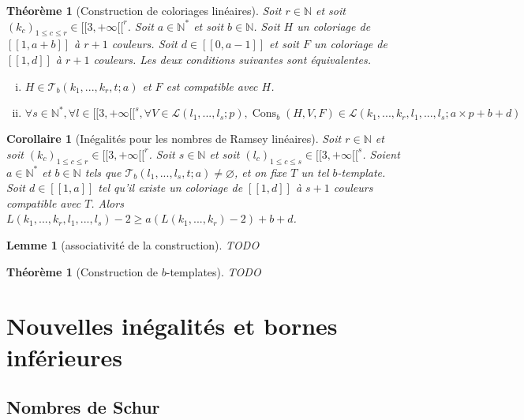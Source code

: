 \documentclass{article}
\newtheorem{theorem}[definition]{Théorème}
\newtheorem{corollary}[definition]{Corollaire}
\newtheorem{lemma}[definition]{Lemme}
\DeclareMathOperator{\cons}{Cons}
\begin{document}
\begin{theorem}[Construction de coloriages linéaires]
\label{thm:b-temp}
Soit \(r \in \mathbb{N}\) et soit \((k_c)_{1 \leqslant c \leqslant r} \in {[\![3, +\infty[\![}^r\). Soit \(a \in \mathbb{N}^*\) et soit \(b \in \mathbb{N}\). Soit \(H\) un coloriage de \([\![1, a + b]\!]\) à \(r + 1\) couleurs. Soit \(d \in [\![0, a - 1]\!]\) et soit \(F\) un coloriage de \([\![1, d]\!]\) à \(r + 1\) couleurs. Les deux conditions suivantes sont équivalentes.

\begin{enumerate}[(i)]
\item \(H \in \mathcal{T}_b(k_1, ..., k_r, t; a)\) et \(F\) est compatible  avec \(H\).
\item \(\forall s \in \mathbb{N}^*, \forall l \in {[\![3, +\infty[\![}^s, \forall V \in \mathcal{L}(l_1, ..., l_s ; p), \cons_b(H, V, F) \in  \mathcal{L}(k_1, ..., k_r, l_1, ..., l_s ; a \times p + b + d)\)
\end{enumerate}
\end{theorem}

\begin{corollary}[Inégalités pour les nombres de Ramsey linéaires]
Soit \(r \in \mathbb{N}\) et soit \((k_c)_{1 \leqslant c \leqslant r} \in {[\![3, +\infty[\![}^r\). Soit \(s \in \mathbb{N}\) et soit \((l_c)_{1 \leqslant c \leqslant s} \in {[\![3, +\infty[\![}^s\). Soient \(a \in \mathbb{N}^*\) et \(b \in \mathbb{N}\) tels que \(\mathcal{T}_b(l_1, ..., l_s, t; a) \neq \varnothing\), et on fixe \(T\) un tel \(b\)-template. Soit \(d \in [\![1, a]\!]\) tel qu'il existe un coloriage de \([\![1, d]\!]\) à \(s + 1\) couleurs compatible avec \(T\).
Alors \(L(k_1, ..., k_r, l_1, ..., l_s) - 2 \geqslant a (L(k_1, ..., k_r) - 2) + b + d\).
\end{corollary}

\begin{lemma}[associativité de la construction]
TODO
\end{lemma}

\begin{theorem}[Construction de \(b\)-templates]
TODO
\end{theorem}

\section{Nouvelles inégalités et bornes inférieures}
\label{sec:results}

\subsection{Nombres de Schur}
\end{document}
